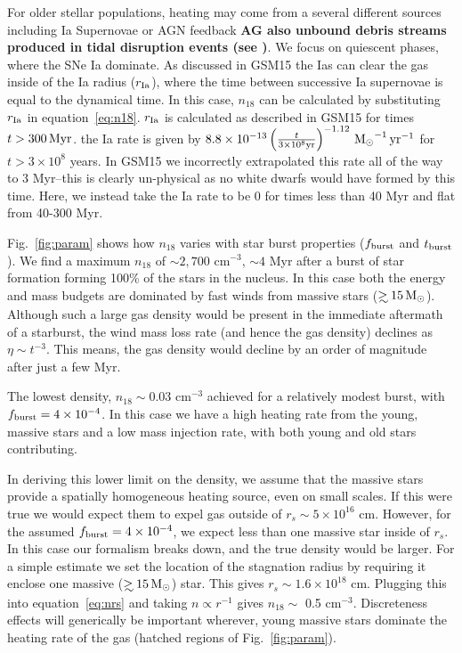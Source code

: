 \documentclass[usenatbib,fleqn]{mnras}
\newcommand\gsim{\mathrel{\rlap{\lower4pt\hbox{\hskip1pt$\sim$}}
    \raise1pt\hbox{$>$}}}
\newcommand{\Msun}{{\rm M_\odot}}
\begin{document}
For older stellar populations, heating may come from a several
different sources including Ia Supernovae or AGN feedback {\bf AG also
  unbound debris streams produced in tidal disruption events (see
  \citep{Guillochon+2015a})}. We focus on quiescent phases, where the
SNe Ia dominate. As discussed in GSM15 the Ias can clear the gas
inside of the Ia radius ($r_{\rm Ia}$), where the time between
successive Ia supernovae is equal to the dynamical time. In this case,
$n_{18}$ can be calculated by substituting $r_{\rm Ia}$ in
equation~\eqref{eq:n18}. $r_{\rm Ia}$ is calculated as described in
GSM15 for times $t>300 \,{\rm Myr}$. the Ia rate is given by $8.8
\times 10^{-13} \left(\frac{t}{3\times 10^{8} {\rm yr}}\right)^{-1.12}
\, \Msun^{-1} \, {\rm yr}^{-1} $ for $t>3\times 10^8$ years. In GSM15
we incorrectly extrapolated this rate all of the way to 3 Myr--this is
clearly un-physical as no white dwarfs would have formed by this
time. Here, we instead take the Ia rate to be 0 for times less than 40
Myr and flat from 40-300 Myr.

Fig.~\ref{fig:param} shows how $n_{18}$ varies with star burst
properties ($f_{\rm burst}$ and $t_{\rm burst}$).  We find a maximum
$n_{18}$ of $\sim 2,700$ cm$^{-3}$, $\sim 4$ Myr after a burst of star
formation forming 100\% of the stars in the nucleus. In this case both
the energy and mass budgets are dominated by fast winds from massive
stars ($\gsim 15 \, \Msun$).  Although such a large gas density would
be present in the immediate aftermath of a starburst, the wind mass
loss rate (and hence the gas density) declines as $\eta \sim
t^{-3}$. This means, the gas density would decline by an order of
magnitude after just a few Myr.

The lowest density, $n_{18}\sim 0.03$ cm$^{-3}$ achieved for a
relatively modest burst, with $f_{\rm burst}=4\times 10^{-4}$. In this
case we have a high heating rate from the young, massive stars and a
low mass injection rate, with both young and old stars contributing.

In deriving this lower limit on the density, we assume that the
massive stars provide a spatially homogeneous heating source, even on
small scales. If this were true we would expect them to expel gas
outside of $r_s \sim 5\times 10^{16}$ cm. However, for the assumed
$f_{\rm burst}=4\times 10^{-4}$, we expect less than one massive star
inside of $r_s$.  In this case our formalism breaks down, and the true
density would be larger. For a simple estimate we set the location of
the stagnation radius by requiring it enclose one massive ($\gsim 15
\, \Msun$) star. This gives $r_s\sim 1.6\times 10^{18}$ cm. Plugging
this into equation~\eqref{eq:nrs} and taking $n\propto r^{-1}$ gives
$n_{18} \sim$ 0.5 cm$^{-3}$. Discreteness effects will generically be
important wherever, young massive stars dominate the heating rate of
the gas (hatched regions of Fig.~\ref{fig:param}).
\end{document}
